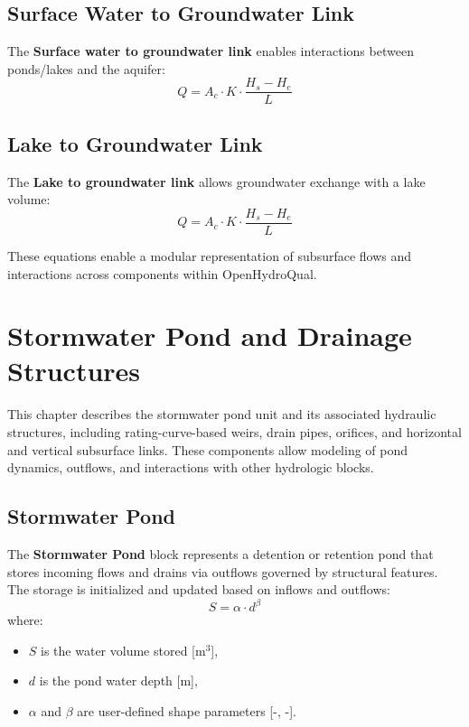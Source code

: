 \documentclass[12pt]{report}
\begin{document}
\section{Surface Water to Groundwater Link}

The \textbf{Surface water to groundwater link} enables interactions between ponds/lakes and the aquifer:
\begin{equation}
Q = A_c \cdot K \cdot \frac{H_s - H_e}{L}
\end{equation}

\section{Lake to Groundwater Link}

The \textbf{Lake to groundwater link} allows groundwater exchange with a lake volume:
\begin{equation}
Q = A_c \cdot K \cdot \frac{H_s - H_e}{L}
\end{equation}

These equations enable a modular representation of subsurface flows and interactions across components within OpenHydroQual.

\chapter{Stormwater Pond and Drainage Structures}

This chapter describes the stormwater pond unit and its associated hydraulic structures, including rating-curve-based weirs, drain pipes, orifices, and horizontal and vertical subsurface links. These components allow modeling of pond dynamics, outflows, and interactions with other hydrologic blocks.

\section{Stormwater Pond}

The \textbf{Stormwater Pond} block represents a detention or retention pond that stores incoming flows and drains via outflows governed by structural features. The storage is initialized and updated based on inflows and outflows:
\begin{equation}
S = \alpha \cdot d^{\beta}
\end{equation}
where:
\begin{itemize}
  \item $S$ is the water volume stored [m$^3$],
  \item $d$ is the pond water depth [m],
  \item $\alpha$ and $\beta$ are user-defined shape parameters [-, -].
\end{itemize}
\end{document}
